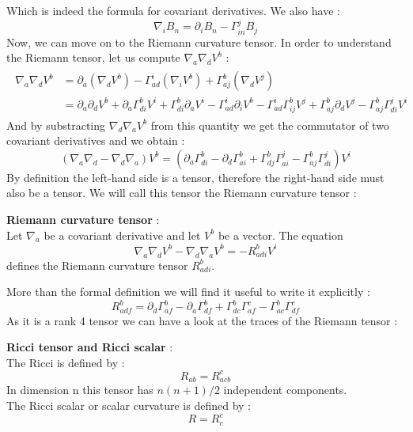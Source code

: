 \documentclass[a4paper,12pt]{article}
\theoremstyle{definition}
\begin{document}
Which is indeed the formula for covariant derivatives.
We also have :
\begin{equation}
	\nabla_iB_n=\partial_iB_n-\Gamma^j_{in}B_j
\end{equation}
Now, we can move on to the Riemann curvature tensor.
In order to understand the Riemann tensor, let us compute $\nabla _a \nabla _d V^b$ :
\begin{align}
\begin{split}
	\nabla _a \nabla _d V^b &= \partial_a(\nabla _d V^b)-\Gamma^i_{ad} (\nabla _i V^b)+\Gamma^b_{aj} (\nabla _d V^j)\\
	&=\partial_a\partial_d V^b+ \partial_a \Gamma^b_{di}V^i+ \Gamma^b_{di}\partial_a V^i - \Gamma^i_{ad}\partial_i V^b
	-\Gamma^i_{ad}\Gamma^b_{ij}V^j+\Gamma^b_{aj}\partial_d V^j-\Gamma^b_{aj}\Gamma^j_{di}V^i
\end{split}
\end{align}
And by substracting $\nabla _d \nabla _a V^b$ from this quantity we get the commutator of two covariant derivatives and we obtain :
\begin{equation}
	(\nabla _a \nabla _d - \nabla _d \nabla _a)V^b=(\partial_a \Gamma^b_{di}-\partial_d \Gamma^b_{ai}+\Gamma^b_{dj}\Gamma^j_{ai}-\Gamma^b_{aj}\Gamma^j_{di})V^i
\end{equation}
By definition the left-hand side is a tensor, therefore the right-hand side must also be a tensor.
We will call this tensor the Riemann curvature tensor :
\begin{definition}
	\textbf{Riemann curvature tensor} :\\
	Let $\nabla_a$ be a covariant derivative and let $V^b$ be a vector. The equation
	\begin{equation}
		\nabla _a \nabla _d V^b - \nabla _d \nabla _aV^b=-R_{adi}^b V^i
	\end{equation}
	defines the Riemann curvature tensor $R_{adi}^b$.
\end{definition}
More than the formal definition we will find it useful to write it explicitly :
\begin{equation} \label{Riemm}
	R_{adf}^b=\partial_d\Gamma^b_{af}-\partial_a\Gamma^b_{df}+\Gamma^b_{dc}\Gamma^c_{af}-\Gamma^b_{ac}\Gamma^c_{df}
\end{equation}
As it is a rank 4 tensor we can have a look at the traces of the Riemann tensor :
\begin{definition}
	\textbf{Ricci tensor and Ricci scalar} :\\
	The Ricci is defined by :
	\begin{equation}\label{Ricc}
		R_{ab}=R_{acb}^c
	\end{equation}
	In dimension n this tensor has $n(n+1)/2$ independent components.\\
	The Ricci scalar or scalar curvature is defined by :
	\begin{equation}
		R=R_c^c
	\end{equation}
\end{definition}
\end{document}
